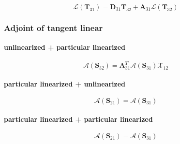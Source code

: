 \begin{equation}
\mathcal{L}(\mathbf{T}_{31}) = \mathbf{D}_{31}\mathbf{T}_{32} + \mathbf{A}_{31}\mathcal{L}(\mathbf{T}_{32})
\label{eq:adding-upward-tangent_linear-homogeneous_linearized_p_homogeneous_linearized-W31}
\end{equation}


%
\subsubsection{Adjoint of tangent linear}
\label{sec:adding-upward-adjoint_of_tangent_linear}

\paragraph{unlinearized + particular linearized}
\label{sec:adding-upward-adjoint_of_tangent_linear-unlinearized_p_particular_linearized}

\begin{equation}
\mathcal{A}(\mathbf{S}_{32}) = \mathbf{A}_{31}^{T}\mathcal{A}(\mathbf{S}_{31})\mathcal{X}_{12}
\label{eq:adding-upward-adjoint_of_tangent_linear-unlinearized_p_particular_linearized-S32_a}
\end{equation}


\paragraph{particular linearized + unlinearized}
\label{sec:adding-upward-adjoint_of_tangent_linear-particular_linearized_p_unlinearized}

\begin{equation}
\mathcal{A}(\mathbf{S}_{21}) = \mathcal{A}(\mathbf{S}_{31})
\label{eq:adding-upward-adjoint_of_tangent_linear-particular_linearized_p_unlinearized-S21_a}
\end{equation}


\paragraph{particular linearized + particular linearized}
\label{sec:adding-upward-adjoint_of_tangent_linear-particular_linearized_particular_linearized}

\begin{equation}
\mathcal{A}(\mathbf{S}_{21}) = \mathcal{A}(\mathbf{S}_{31})
\label{eq:adding-upward-adjoint_of_tangent_linear-particular_linearized_particular_linearized-S21_a}
\end{equation}

